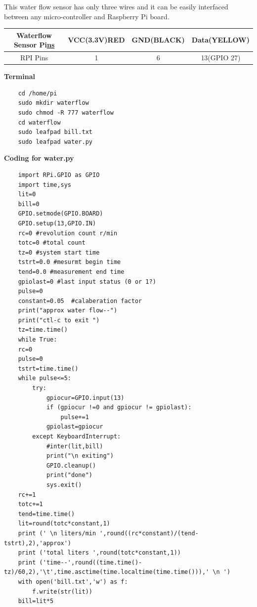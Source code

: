 \documentclass[12pt,a4paper]{article}
\begin{document}
\begin{flushleft}
This water flow sensor has only three wires and it can be easily interfaced between any micro-controller and Raspberry Pi board.\\
\begin{table}[h!]
\centering
\begin{tabular}{|c|l|l|l|} 
\hline
Waterflow Sensor Pi\uline{ns} & \textcolor[rgb]{0.808,0.094,0.118}{VCC(}\textcolor[rgb]{0.808,0.094,0.118}{3.3V}\textcolor[rgb]{0.808,0.094,0.118}{)RED} & GND(\textbf{BLACK}) & \textcolor[rgb]{1,0.949,0}{Data(}\textcolor[rgb]{1,0.949,0}{YELLOW}\textcolor[rgb]{1,0.949,0}{)} \\ 
\hline
RPI Pins & \multicolumn{1}{c|}{1} & \multicolumn{1}{c|}{6} & \multicolumn{1}{c|}{13(GPIO 27)} \\
\hline
\end{tabular}
\end{table}
\textbf{Terminal}\\
\begin{lstlisting}
    cd /home/pi
    sudo mkdir waterflow
    sudo chmod -R 777 waterflow
    cd waterflow
    sudo leafpad bill.txt
    sudo leafpad water.py
\end{lstlisting}
\vspace{5mm}

\textbf{Coding for water.py}
\begin{lstlisting}
    import RPi.GPIO as GPIO
    import time,sys
    lit=0
    bill=0
    GPIO.setmode(GPIO.BOARD)
    GPIO.setup(13,GPIO.IN)
    rc=0 #revolution count r/min
    totc=0 #total count
    tz=0 #system start time
    tstrt=0.0 #mesurmt begin time
    tend=0.0 #measurement end time
    gpiolast=0 #last input status (0 or 1?)
    pulse=0
    constant=0.05  #calaberation factor
    print("approx water flow--")
    print("ctl-c to exit ")
    tz=time.time()
    while True:
    rc=0
    pulse=0
    tstrt=time.time()
    while pulse<=5:
        try:
            gpiocur=GPIO.input(13)
            if (gpiocur !=0 and gpiocur != gpiolast):
                pulse+=1
            gpiolast=gpiocur
        except KeyboardInterrupt:
            #inter(lit,bill)
            print("\n exiting")
            GPIO.cleanup()
            print("done")
            sys.exit()
    rc+=1
    totc+=1
    tend=time.time()
    lit=round(totc*constant,1)
    print (' \n liters/min ',round((rc*constant)/(tend-tstrt),2),'approx')
    print ('total liters ',round(totc*constant,1))
    print ('time--',round((time.time()-tz)/60,2),'\t',time.asctime(time.localtime(time.time())),' \n ')
    with open('bill.txt','w') as f:
        f.write(str(lit))
    bill=lit*5
\end{lstlisting}
\vspace{5mm}


\end{flushleft}
\end{document}
